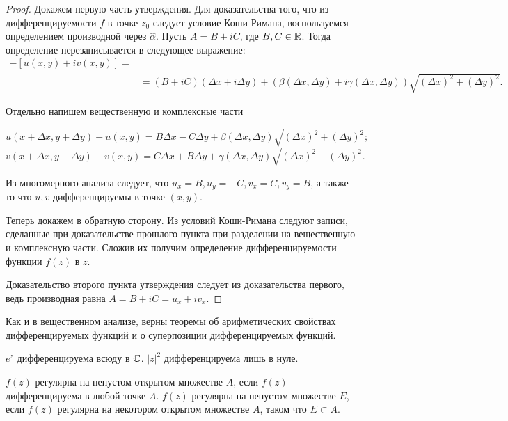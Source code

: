 \begin{proof}
    Докажем первую часть утверждения. Для доказательства того, что из дифференцируемости \(f\) в
    точке \(z_0\) следует условие Коши-Римана, воспользуемся определением производной через
    \(\hat{\alpha}\). Пусть \(A = B + iC\), где \(B, C \in \mathbb{R}\). Тогда определение перезаписывается
    в следующее выражение:
    \begin{align}
        [u(x + \Delta x, y + \Delta y) &+ iv(x + \Delta x, y + \Delta y)] - [u(x, y) + iv(x, y)] =
        \nonumber \\ &= (B + iC)(\Delta x + i\Delta y) + (\beta (\Delta x, \Delta y) + i \gamma
        (\Delta x, \Delta y)) \sqrt{(\Delta x)^2 + (\Delta y) ^ 2}. \tag{1}
    \end{align}

    Отдельно напишем вещественную и комплексные части

    \[u(x + \Delta x, y + \Delta y) - u(x, y) = B \Delta x - C \Delta y + \beta(\Delta x,
    \Delta y)\sqrt{(\Delta x)^2 + (\Delta y) ^ 2};\]
    \[v(x + \Delta x, y + \Delta y) - v(x, y) = C \Delta x + B \Delta y + \gamma(\Delta x,
    \Delta y)\sqrt{(\Delta x)^2 + (\Delta y) ^ 2}.\]

    Из многомерного анализа следует, что \(u_x = B, u_y = -C, v_x = C, v_y = B\), а также то что
    \(u, v\) дифференцируемы в точке \((x, y)\).

    Теперь докажем в обратную сторону. Из условий Коши-Римана следуют записи, сделанные при
    доказательстве прошлого пункта при разделении на вещественную и комплексную части. Сложив их
    получим определение дифференцируемости функции \(f(z)\) в \(z\).

    Доказательство второго пункта утверждения следует из доказательства первого, ведь производная
    равна \(A = B + iC = u_x + i v_x\).
\end{proof}

\begin{note}
    Как и в вещественном анализе, верны теоремы об арифметических свойствах дифференцируемых
    функций и о суперпозиции дифференцируемых функций.
\end{note}

\begin{example}
    \(e^z\) дифференцируема всюду в \(\mathbb{C}\). \(|z|^2\) дифференцируема лишь в нуле.
\end{example}

\begin{definition}
    \(f(z)\) регулярна на непустом открытом множестве \(A\), если \(f(z)\) дифференцируема в любой
    точке \(A\). \(f(z)\) регулярна на непустом множестве \(E\), если \(f(z)\) регулярна на
    некотором открытом множестве \(A\), таком что \(E \subset A\).
\end{definition}

